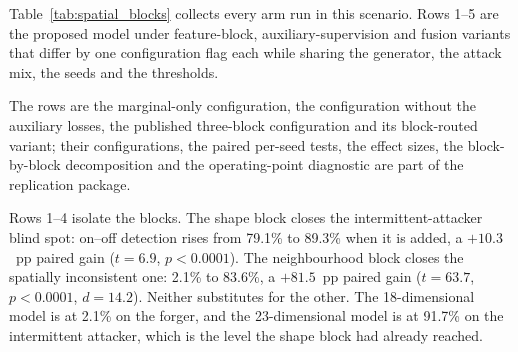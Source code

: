 \documentclass[notspecified,article,submit,moreauthors]{Definitions/mdpi}
\begin{document}
Table~\ref{tab:spatial_blocks} collects every arm run in this scenario. Rows 1--5 are the proposed model under feature-block, auxiliary-supervision and fusion variants that differ by one configuration flag each while sharing the generator, the attack mix, the seeds and the thresholds.

\begin{table}[!htbp]
  \centering
  \caption{Every arm run in the spatially inconsistent scenario (800 UAVs, malicious ratio 0.3, 19 evaluation seeds). Rows 1--5 are the proposed model under feature-block, auxiliary-supervision and fusion variants. Entries are detection rates in percent, benign spec. being one minus the false-positive rate, and Accuracy the overall mean. Bold marks the best value in the column.}
  \label{tab:spatial_blocks}
  \footnotesize
  \setlength{\tabcolsep}{2.5pt}
  \renewcommand{\arraystretch}{1.15}
\par
\vspace{2pt}
\raggedright\scriptsize
The rows are the marginal-only configuration, the configuration without the auxiliary losses, the published three-block configuration and its block-routed variant; their configurations, the paired per-seed tests, the effect sizes, the block-by-block decomposition and the operating-point diagnostic are part of the replication package.
\end{table}

Rows 1--4 isolate the blocks. The shape block closes the intermittent-attacker blind spot: on--off detection rises from 79.1\% to 89.3\% when it is added, a $+10.3$~pp paired gain ($t=6.9$, $p<0.0001$). The neighbourhood block closes the spatially inconsistent one: 2.1\% to 83.6\%, a $+81.5$~pp paired gain ($t=63.7$, $p<0.0001$, $d=14.2$). Neither substitutes for the other. The 18-dimensional model is at 2.1\% on the forger, and the 23-dimensional model is at 91.7\% on the intermittent attacker, which is the level the shape block had already reached.
\end{document}
